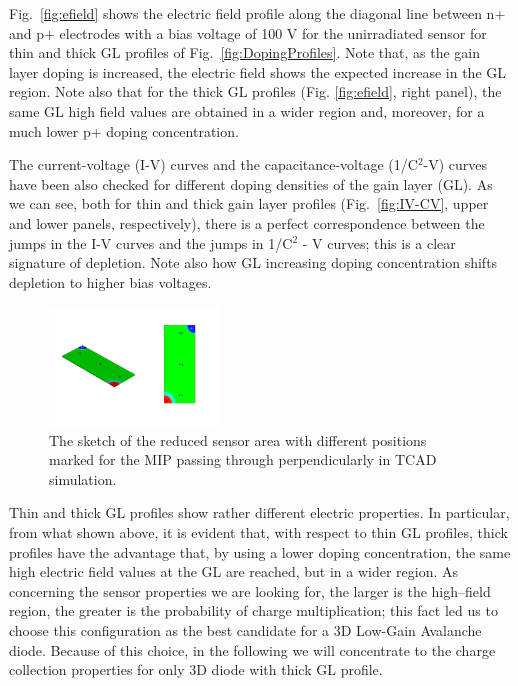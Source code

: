 \documentclass[aps,pt14,superscriptaddress,showpacs,floatfix,nofootinbib]{revtex4}
\begin{document}
Fig.~\ref{fig:efield} shows the electric field profile along the diagonal line between n+ and p+ electrodes with a bias voltage of 100 V for the unirradiated sensor for thin and thick GL profiles of Fig.~\ref{fig:DopingProfiles}. Note that, as the gain layer doping is increased, the electric field shows the expected increase in the GL region. Note also that for the thick GL profiles (Fig. \ref{fig:efield}, right panel), the same GL high field values are obtained in a wider region and, moreover, for a much lower p+ doping concentration. 



The current-voltage (I-V) curves and the capacitance-voltage (1/C$^2$-V) curves have been also checked for 
different doping densities of the gain layer (GL). As we can see, both for thin and thick gain layer profiles (Fig.~\ref{fig:IV-CV}, upper and lower panels, respectively), there is a perfect correspondence between the jumps in the I-V curves and the jumps in 1/C$^2$ - V curves; this is a clear signature of depletion. Note also how GL increasing doping concentration shifts depletion to higher bias voltages.   

\begin{figure}[hbtp]
\begin{center}
\includegraphics[width=0.4\textwidth,keepaspectratio]{figures1/Slice.pdf}
\caption{The sketch of the reduced sensor area with different positions marked for the MIP passing through perpendicularly in TCAD simulation.\label{fig:box_points}}
\end{center}
\end{figure}

Thin and thick GL profiles show rather different electric properties. In particular, from what shown above, it is evident that, with respect to thin GL profiles, thick profiles have the advantage that, by using a lower doping concentration, the same high electric field values at the GL are reached, but in a wider region. As concerning the sensor properties we are looking for, the larger is the high--field region, the greater is the probability of charge multiplication; this fact led us to choose this configuration as the best candidate for a 3D Low-Gain Avalanche diode. Because of this choice, in the following we will concentrate to the charge collection properties for only 3D diode with thick GL profile.
\end{document}
